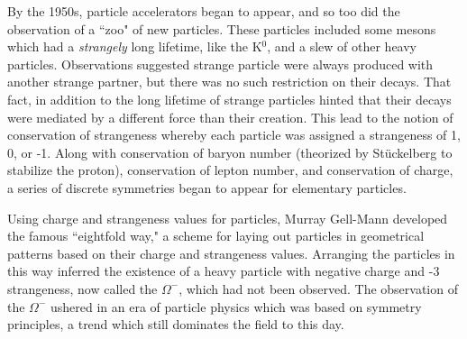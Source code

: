    By the 1950s, particle accelerators began to appear, and so too did the observation of a ``zoo" of new particles. These particles included some mesons which had a \emph{strangely} long lifetime, like the K$^0$, and a slew of other heavy particles. Observations suggested strange particle were always produced with another strange partner, but there was no such restriction on their decays. That fact, in addition to the long lifetime of strange particles hinted that their decays were mediated by a different force than their creation. This lead to the notion of conservation of strangeness whereby each particle was assigned a strangeness of 1, 0, or -1. Along with conservation of baryon number (theorized by Stückelberg to stabilize the proton), conservation of lepton number, and conservation of charge, a series of discrete symmetries began to appear for elementary particles. 

   Using charge and strangeness values for particles, Murray Gell-Mann developed the famous ``eightfold way," a scheme for laying out particles in geometrical patterns based on their charge and strangeness values. Arranging the particles in this way inferred the existence of a heavy particle with negative charge and -3 strangeness, now called the $\Omega^-$, which had not been observed. The observation of the $\Omega^-$ ushered in an era of particle physics which was based on symmetry principles, a trend which still dominates the field to this day.

